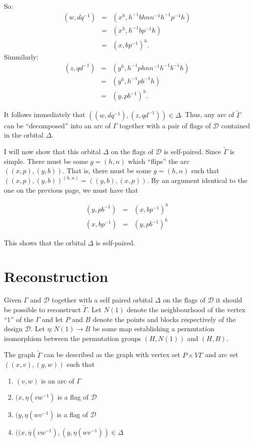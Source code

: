 \documentclass[12pt]{amsart}
\theoremstyle{plain}
\theoremstyle{definition}
\theoremstyle{remark}
\newcommand{\cD}{\mathcal{D}}
\begin{document}
So: 
\begin{eqnarray*}
(w,dq^{-1}) & = & (x^h, h^{-1}bhnn^{-1}h^{-1}p^{-1}h) \\
            & = & (x^h, h^{-1}bp^{-1}h) \\
	    & = & (x,bp^{-1})^h.
\end{eqnarray*}
Simmilarly:
\begin{eqnarray*}
(z,qd^{-1}) & = & (y^h, h^{-1}phnn^{-1}h^{-1}b^{-1}h) \\
            & = & (y^h, h^{-1}pb^{-1}h) \\
	    & = & (y,pb^{-1})^h.
\end{eqnarray*}

\newpage
It follows immediately that $((w,dq^{-1}),(z,qd^{-1})) \in \Delta$.
Thus, any arc of $\widetilde{\Gamma}$ can be ``decomposed''
into an arc of $\Gamma$ together with a pair of flags of $\cD$
contained in the orbital $\Delta$.
\hfill \break

I will now show that this orbital $\Delta$ on the flags of $\cD$
is self-paired.
Since $\widetilde{\Gamma}$ is simple.
There must be some $g = (h,n)$ which ``flips'' the arc
$((x,p), (y,b))$. That is, there must be some $g = (h,n)$
such that $((x,p), (y,b))^{(h,n)} = ((y,b), (x,p))$.
By an argument identical to the one on the previous page, 
we must have that

\begin{eqnarray*}
(y,pb^{-1}) & = & (x,bp^{-1})^h \\
(x,bp^{-1}) & = & (y,pb^{-1})^h
\end{eqnarray*}

\hfill \break
This shows that the orbital $\Delta$ is self-paired.

\section{Reconstruction}
Given $\Gamma$ and $\cD$ together with a self paired orbital $\Delta$
on the flags of $\cD$ it should be possible to reconstruct $\widetilde{\Gamma}$.
Let $N(1)$ denote the neighbourhood of the vertex ``$1$'' of the $\Gamma$
and let $P$ and $B$ denote the points and blocks respectively 
of the design $\cD$.
Let $\eta : N(1) \to B$ be some map establishing a permutation isomorphism
between the permutation groups $(H,N(1))$ and $(H,B)$.

The graph $\widetilde{\Gamma}$ can be described as the graph
with vertex set $P \times V \Gamma$
and arc set $((x,v), (y,w))$ such that 
\begin{enumerate}
\item $(v,w)$ is an arc of $\Gamma$
\item $(x,\eta(vw^{-1})$ is a flag of $\cD$
\item $(y, \eta(wv^{-1})$ is a flag of $\cD$
\item $((x,\eta(vw^{-1}),(y, \eta(wv^{-1})) \in \Delta$ 
\end{enumerate}
\hfill \break
\end{document}

